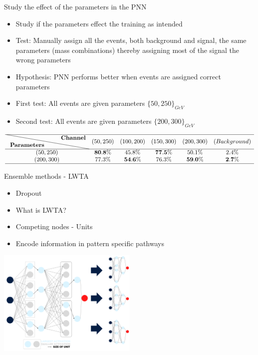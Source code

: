 \documentclass[UKenglish]{beamer}
\begin{document}
\begin{frame}{Study the effect of the parameters in the PNN}
    \begin{itemize}
        \item Study if the parameters effect the training as intended
        \item Test: Manually assign all the events, both background and 
        signal, the same parameters (mass combinations) thereby assigning
        most of the signal the wrong parameters
        \item Hypothesis: PNN performs better when events are assigned correct
        parameters 
        \item First test: All events are given parameters $\{50,250\}_{GeV}$
        \item Second test: All events are given parameters $\{200,300\}_{GeV}$
    \end{itemize}
    \begin{table}
        \tiny
        \centering
        $
        \begin{array}{cccccc}
            \hline \text { \diagbox{\textbf{Parameters}}{\textbf{Channel}} }  & \text {$(50,250)$} & \text {$(100,200)$} & \text {$(150,300)$} & \text {$(200,300)$} & \text {$(Background)$} \\
            \hline \text {$(50,250)$}   & \text { $\bf{80.8}\%$ } & \text { $45.8\%$ } & \text { $\bf{77.5}\%$ } & \text { $50.1\%$ } & \text { $2.4\%$ }  \\
            \text {$(200,300)$}   & \text { $77.3\%$ } & \text { $\bf{54.6}\%$ } & \text { $76.3\%$ } & \text { $\bf{59.0}\%$ } & \text { $\bf{2.7}\%$ }\\
            \hline
        \end{array}
        $
    \end{table}
\end{frame}

\begin{frame}{Ensemble methods - LWTA}
    \begin{itemize}
        \item Dropout
        \item What is LWTA?
        \item Competing nodes - Units
        \item Encode information in pattern specific pathways
    \end{itemize}    
    \centering
    \includegraphics[width = 0.5\textwidth]{figures/Max_out}
\end{frame}
\end{document}
